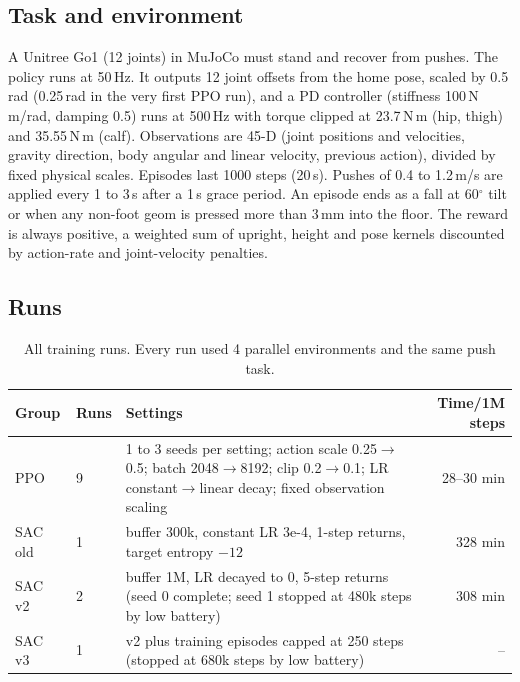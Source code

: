 \documentclass[11pt,a4paper]{article}
\begin{document}
\subsection{Task and environment}
A Unitree Go1 (12 joints) in MuJoCo must stand and recover from pushes. The policy runs at 50\,Hz. It outputs 12 joint offsets from the home pose, scaled by 0.5\,rad (0.25\,rad in the very first PPO run), and a PD controller (stiffness 100\,N\,m/rad, damping 0.5) runs at 500\,Hz with torque clipped at 23.7\,N\,m (hip, thigh) and 35.55\,N\,m (calf). Observations are 45-D (joint positions and velocities, gravity direction, body angular and linear velocity, previous action), divided by fixed physical scales. Episodes last 1000 steps (20\,s). Pushes of 0.4 to 1.2\,m/s are applied every 1 to 3\,s after a 1\,s grace period. An episode ends as a fall at 60$^\circ$ tilt or when any non-foot geom is pressed more than 3\,mm into the floor. The reward is always positive, a weighted sum of upright, height and pose kernels discounted by action-rate and joint-velocity penalties.

\subsection{Runs}
\begin{table}[H]\centering\small
\begin{tabular}{@{}llp{7.2cm}r@{}}
\toprule
Group & Runs & Settings & Time/1M steps\\\midrule
PPO & 9 & 1 to 3 seeds per setting; action scale 0.25$\to$0.5; batch 2048$\to$8192; clip 0.2$\to$0.1; LR constant$\to$linear decay; fixed observation scaling & 28--30 min\\
SAC old & 1 & buffer 300k, constant LR 3e-4, 1-step returns, target entropy $-12$ & 328 min\\
SAC v2 & 2 & buffer 1M, LR decayed to 0, 5-step returns (seed 0 complete; seed 1 stopped at 480k steps by low battery) & 308 min\\
SAC v3 & 1 & v2 plus training episodes capped at 250 steps (stopped at 680k steps by low battery) & --\\
\bottomrule\end{tabular}
\caption{All training runs. Every run used 4 parallel environments and the same push task.}
\end{table}
\end{document}
